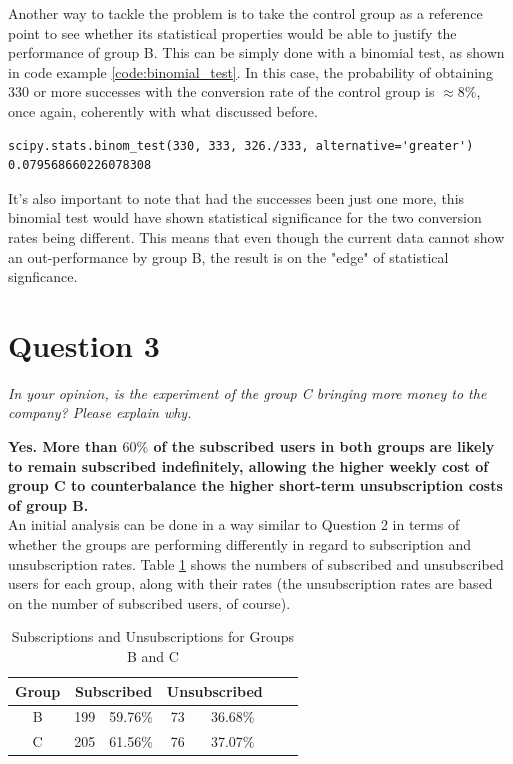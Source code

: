 \documentclass[paper=a4, fontsize=10pt]{report}
\begin{document}
Another way to tackle the problem is to take the control group as a reference point to see whether its statistical properties would be
able to justify the performance of group B. This can be simply done with a binomial test, as shown in code example \ref{code:binomial_test}. In this case, 
the probability
of obtaining 330 or more successes with the conversion rate of the control group is $\approx 8\%$, once again, coherently with what discussed before.

\footnotesize
\begin{lstlisting}[frame=single,caption= Binomial Test\label{code:binomial_test}]
scipy.stats.binom_test(330, 333, 326./333, alternative='greater')
0.079568660226078308
\end{lstlisting}
\normalsize

It's also important to note that had the successes been just one more, this binomial test would have shown statistical significance
for the two conversion rates being different. This means that even though the current data cannot show an out-performance by 
group B, the result is on the "edge" of statistical signficance. 

\section*{Question 3}

\textit{In your opinion, is the experiment of the group C bringing more money to the company? Please explain why.}

\textbf{Yes. More than $60\%$ of the subscribed users in both groups are likely to remain subscribed indefinitely, allowing
the higher weekly cost of group C to counterbalance the higher short-term unsubscription costs of group B.}\\


An initial analysis can be done in a way similar to Question 2 in terms of whether the groups are performing differently in regard to subscription and unsubscription rates.
Table \ref{tab:sub_unsub_rates} shows the numbers of subscribed and unsubscribed users for each group, along with their rates (the unsubscription rates are based on the number of subscribed users, of course).

\begin{table}[htbp]
\normalsize

  \centering
  \caption{Subscriptions and Unsubscriptions for Groups B and C}
    \begin{tabular}{ccccccc}
    \toprule
    \textbf{Group } & \multicolumn{2}{c}{\textbf{Subscribed}} & \multicolumn{2}{c}{\textbf{Unsubscribed}} \\
    \midrule
    B & 199  & 59.76\% & 73  & 36.68\%  \\
    C & 205   & 61.56\% & 76   & 37.07\%  \\
    \bottomrule
    \end{tabular}%
  \label{tab:sub_unsub_rates}%
\end{table}%
\normalsize
\end{document}
